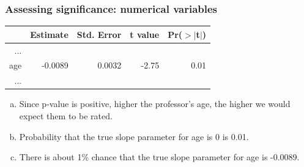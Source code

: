 
\begin{frame}
\frametitle{Assessing significance: numerical variables}


{\scriptsize
\begin{center}
\begin{tabular}{rrrrr}
  \hline
 & Estimate & Std. Error & t value & Pr($>$$|$t$|$) \\ 
  \hline
...\\
  age & -0.0089 & 0.0032 & -2.75 & 0.01 \\ 
...\\
   \hline
\end{tabular}
\end{center}
}

\begin{enumerate}[(a)]
\item Since p-value is positive, higher the professor's age, the higher we would expect them to be rated.
\item Probability that the true slope parameter for age is 0 is 0.01.
\item There is about 1\% chance that the true slope parameter for age is -0.0089.
\end{enumerate}

\end{frame}


